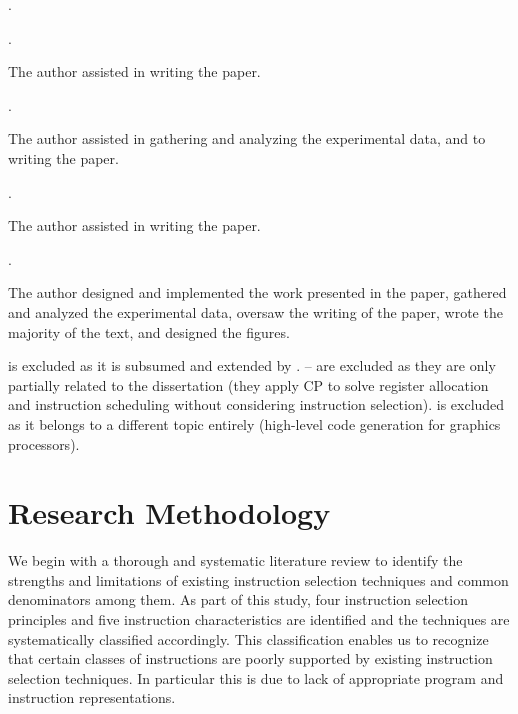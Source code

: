 \begin{publications}[resume]
  \item {}
    .
  \item {}
    .
    \begin{authorsContribution}
      The author assisted in writing the paper.
    \end{authorsContribution}
  \item {}
    .
    \begin{authorsContribution}
      The author assisted in gathering and analyzing the experimental data, and
      to writing the paper.
    \end{authorsContribution}
  \item {}
    .
    \begin{authorsContribution}
      The author assisted in writing the paper.
    \end{authorsContribution}
  \item {}
    .
    \begin{authorsContribution}
      The author designed and implemented the work presented in the paper,
      gathered and analyzed the experimental data, oversaw the writing of the
      paper, wrote the majority of the text, and designed the figures.
    \end{authorsContribution}
\end{publications}
%
 is excluded as it is subsumed and extended by
. -- are
excluded as they are only partially related to the dissertation (they apply
\glsdesc{CP} to solve \gls{register allocation} and \gls{instruction scheduling}
without considering \gls{instruction selection}).  is
excluded as it belongs to a different topic entirely (high-level code generation
for graphics processors).


\section{Research Methodology}

We begin with a thorough and systematic literature review to identify the
strengths and limitations of existing \gls{instruction selection} techniques and
common denominators among them.
%
As part of this study, four \gls{instruction selection} \glspl{principle} and
five \glspl{instruction characteristic} are identified and the techniques are
systematically classified accordingly.
%
This classification enables us to recognize that certain classes of
\glspl{instruction} are poorly supported by existing \gls{instruction selection}
techniques.
%
In particular this is due to lack of appropriate \gls{program} and
\gls{instruction} representations.

